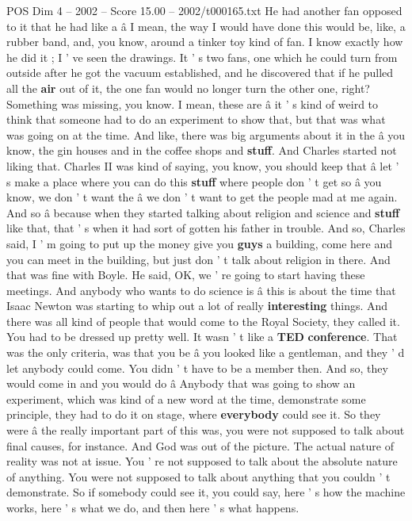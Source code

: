 \begin{textsample}{POS Dim 4 – 2002 – Score 15.00 – 2002/t000165.txt}
He had another fan opposed to it that he had like a â I mean, the way I would have done this would be, like, a rubber band, and, you know, around a tinker toy kind of fan.
I know exactly how he did it ; I ' ve seen the drawings.
It ' s two fans, one which he could turn from outside after he got the vacuum established, and he discovered that if he pulled all the \textbf{air} out of it, the one fan would no longer turn the other one, right?
Something was missing, you know.
I mean, these are â it ' s kind of weird to think that someone had to do an experiment to show that, but that was what was going on at the time.
And like, there was big arguments about it in the â you know, the gin houses and in the coffee shops and \textbf{stuff}.
And Charles started not liking that.
Charles II was kind of saying, you know, you should keep that â let ' s make a place where you can do this \textbf{stuff} where people don ' t get so â you know, we don ' t want the â we don ' t want to get the people mad at me again.
And so â because when they started talking about religion and science and \textbf{stuff} like that, that ' s when it had sort of gotten his father in trouble.
And so, Charles said, I ' m going to put up the money give you \textbf{guys} a building, come here and you can meet in the building, but just don ' t talk about religion in there.
And that was fine with Boyle.
He said, OK, we ' re going to start having these meetings.
And anybody who wants to do science is â this is about the time that Isaac Newton was starting to whip out a lot of really \textbf{interesting} things.
And there was all kind of people that would come to the Royal Society, they called it.
You had to be dressed up pretty well.
It wasn ' t like a \textbf{TED} \textbf{conference}.
That was the only criteria, was that you be â you looked like a gentleman, and they ' d let anybody could come.
You didn ' t have to be a member then.
And so, they would come in and you would do â Anybody that was going to show an experiment, which was kind of a new word at the time, demonstrate some principle, they had to do it on stage, where \textbf{everybody} could see it.
So they were â the really important part of this was, you were not supposed to talk about final causes, for instance.
And God was out of the picture.
The actual nature of reality was not at issue.
You ' re not supposed to talk about the absolute nature of anything.
You were not supposed to talk about anything that you couldn ' t demonstrate.
So if somebody could see it, you could say, here ' s how the machine works, here ' s what we do, and then here ' s what happens.

\end{textsample}
